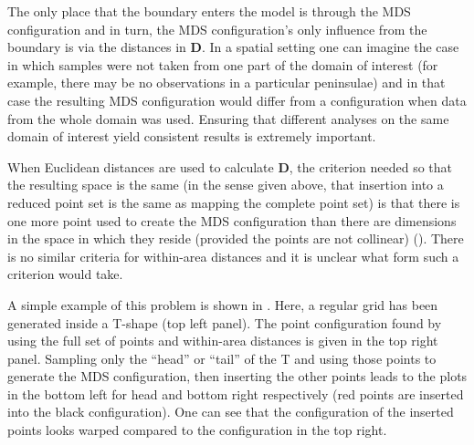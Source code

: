 The only place that the boundary enters the model is through the MDS configuration and in turn, the MDS configuration's only influence from the boundary is via the distances in $\mathbf{D}$. In a spatial setting one can imagine the case in which samples were not taken from one part of the domain of interest (for example, there may be no observations in a particular peninsulae) and in that case the resulting MDS configuration would differ from a configuration when data from the whole domain was used. Ensuring that different analyses on the same domain of interest yield consistent results is extremely important.

When Euclidean distances are used to calculate $\mathbf{D}$, the criterion needed so that the resulting space is the same (in the sense given above, that insertion into a reduced point set is the same as mapping the complete point set) is that there is one more point used to create the MDS configuration than there are dimensions in the space in which they reside (provided the points are not collinear) (\cite{landmark}). There is no similar criteria for within-area distances and it is unclear what form such a criterion would take.

A simple example of this problem is shown\label{cor-r32} in . Here, a regular grid has been generated inside a T-shape (top left panel). The point configuration found by using the full set of points and within-area distances is given in the top right panel. Sampling only the ``head'' or ``tail'' of the T and using those points to generate the MDS  configuration, then inserting the other points leads to the plots in the bottom left for head and bottom right respectively (red points are inserted into the black configuration). One can see that the configuration of the inserted points looks warped compared to the configuration in the top right. 


